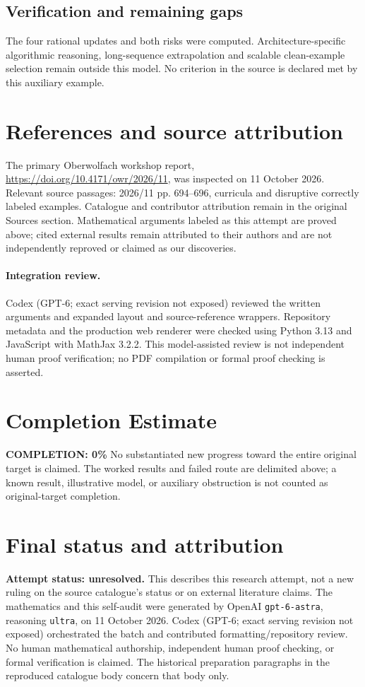 \documentclass[11pt]{article}
\begin{document}
\subsection{Verification and remaining gaps}
The four rational updates and both risks were computed. Architecture-specific algorithmic reasoning, long-sequence extrapolation and scalable clean-example selection remain outside this model. No criterion in the source is declared met by this auxiliary example.

\section{References and source attribution}
The primary Oberwolfach workshop report, \url{https://doi.org/10.4171/owr/2026/11}, was inspected on 11 October 2026. Relevant source passages: 2026/11 pp. 694--696, curricula and disruptive correctly labeled examples. Catalogue and contributor attribution remain in the original Sources section. Mathematical arguments labeled as this attempt are proved above; cited external results remain attributed to their authors and are not independently reproved or claimed as our discoveries.


\paragraph{Integration review.} Codex (GPT-6; exact serving revision not exposed) reviewed the written arguments and expanded layout and source-reference wrappers. Repository metadata and the production web renderer were checked using Python 3.13 and JavaScript with MathJax 3.2.2. This model-assisted review is not independent human proof verification; no PDF compilation or formal proof checking is asserted.

\section{Completion Estimate}
\noindent\textbf{COMPLETION: 0\%}
No substantiated new progress toward the entire original target is claimed. The worked results and failed route are delimited above; a known result, illustrative model, or auxiliary obstruction is not counted as original-target completion.

\section{Final status and attribution}
\textbf{Attempt status: unresolved.} This describes this research attempt, not a new ruling on the source catalogue's status or on external literature claims.
The mathematics and this self-audit were generated by OpenAI \texttt{gpt-6-astra}, reasoning \texttt{ultra}, on 11 October 2026. Codex (GPT-6; exact serving revision not exposed) orchestrated the batch and contributed formatting/repository review. No human mathematical authorship, independent human proof checking, or formal verification is claimed. The historical preparation paragraphs in the reproduced catalogue body concern that body only.
\end{document}
